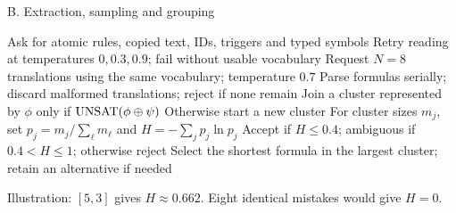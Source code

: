 \documentclass[aspectratio=169,11pt]{beamer}
\begin{document}
\begin{frame}[noframenumbering,label=app-b]{B. Extraction, sampling and grouping}
\backuptext
\begin{algorithmic}[1]
\State Ask for atomic rules, copied text, IDs, triggers and typed symbols
\State Retry reading at temperatures $0,0.3,0.9$; fail without usable vocabulary
 \State Request $N=8$ translations using the same vocabulary; temperature $0.7$
\EndFor
\State Parse formulas serially; discard malformed translations; reject if none remain
 \State Join a cluster represented by $\phi$ only if $\operatorname{UNSAT}(\phi\oplus\psi)$
 \State Otherwise start a new cluster
\EndFor
\State For cluster sizes $m_j$, set $p_j=m_j/\sum_\ell m_\ell$ and $H=-\sum_jp_j\ln p_j$
\State Accept if $H\le0.4$; ambiguous if $0.4<H\le1$; otherwise reject
\State Select the shortest formula in the largest cluster; retain an alternative if needed
\end{algorithmic}
\vspace{0mm}
Illustration: $[5,3]$ gives $H\approx0.662$. Eight identical mistakes would give $H=0$.\par\vspace{0.25mm}
\end{frame}
\end{document}
